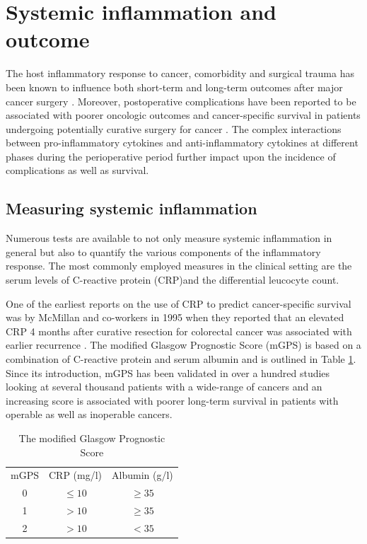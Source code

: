 \clearpage

\section{Systemic inflammation and outcome}
\label{sec:intro_systemic_inflammation_outcome}

The host inflammatory response to cancer, comorbidity and surgical trauma has been known to influence both short-term and long-term outcomes after major cancer surgery \parencite{mcmillan_measurement_2001, read_differential_2004, roxburgh_relationship_2010}.
Moreover, postoperative complications have been reported to be associated with poorer oncologic outcomes and cancer-specific survival in patients undergoing potentially curative surgery for cancer \parencite{mcardle_impact_2005}. 
The complex interactions between pro-inflammatory cytokines and anti-inflammatory cytokines at different phases during the perioperative period further impact upon the incidence of complications as well as survival.

\subsection{Measuring systemic inflammation}
Numerous tests are available to not only measure systemic inflammation in general but also to quantify the various components of the inflammatory response. 
The most commonly employed measures in the clinical setting are the serum levels of C-reactive protein (CRP)and the differential leucocyte count. 

One of the earliest reports on the use of CRP to predict cancer-specific survival was by McMillan and co-workers in 1995 when they reported that an elevated CRP 4 months after curative resection for colorectal cancer was associated with earlier recurrence \parencite{mcmillan_prospective_1995}. 
The modified Glasgow Prognostic Score (mGPS) \parencite{elahi_score_2004} is based on a combination of C-reactive protein and serum albumin and is outlined in Table \ref{table:mGPS}.
Since its introduction, mGPS has been validated in over a hundred studies looking at several thousand patients with a wide-range of cancers and an increasing score is associated with poorer long-term survival in patients with operable as well as inoperable cancers.

\begin{table}[h]
	\centering
	\caption{The modified Glasgow Prognostic Score}
	\label{table:mGPS}
	\renewcommand{\arraystretch}{1.5} %
	\setlength{\tabcolsep}{12pt} %
	\begin{tabular}{|ccc|}
		\hline
		mGPS & CRP (mg/l) & Albumin (g/l) \\
		 0   & $\leq 10$  & $\geq 35$     \\
		 1   & $> 10$     & $\geq 35$     \\
		 2   & $> 10$     & $< 35$        \\ \hline
	\end{tabular}
\end{table}


